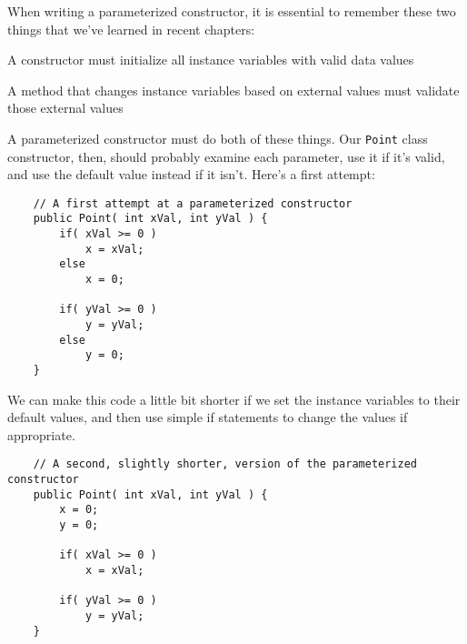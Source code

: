 When writing a parameterized constructor, it is essential to remember these two things that we've learned in recent chapters:

\bi
\item A constructor must initialize all instance variables with valid data values
\item A method that changes instance variables based on external values must validate those external values
\ei

A parameterized constructor must do both of these things.  Our \texttt{Point} class constructor, then, should probably examine each parameter, use it if it's valid, and use the default value instead if it isn't.  Here's a first attempt:

\begin{verbatim}
    // A first attempt at a parameterized constructor
    public Point( int xVal, int yVal ) {
        if( xVal >= 0 )
            x = xVal;
        else
            x = 0;

        if( yVal >= 0 )
            y = yVal;
        else
            y = 0;
    }
\end{verbatim}

We can make this code a little bit shorter if we set the instance variables to their default values, and then use simple if statements to change the values if appropriate.

\begin{verbatim}
    // A second, slightly shorter, version of the parameterized constructor
    public Point( int xVal, int yVal ) {
        x = 0;
        y = 0;

        if( xVal >= 0 )
            x = xVal;

        if( yVal >= 0 )
            y = yVal;
    }
\end{verbatim}

